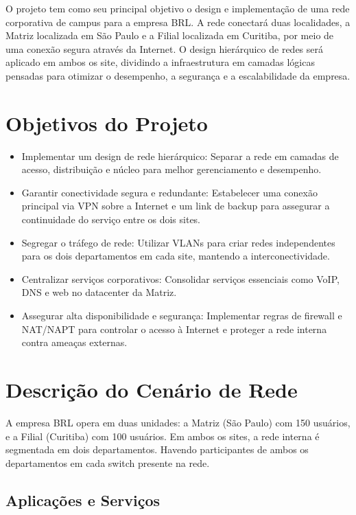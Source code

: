 \documentclass[a4paper, 12pt]{article}
\begin{document}
O projeto tem como seu principal objetivo o design e implementação de uma rede corporativa de campus para a empresa BRL. A rede conectará duas localidades, a Matriz localizada em São Paulo e a Filial localizada em Curitiba, por meio de uma conexão segura através da Internet. O design hierárquico de redes será aplicado em ambos os site, dividindo a infraestrutura em camadas lógicas pensadas para otimizar o desempenho, a segurança e a escalabilidade da empresa.

\section{Objetivos do Projeto}
\label{sec:objetivos}

\begin{itemize}
    \item Implementar um design de rede hierárquico: Separar a rede em camadas de acesso, distribuição e núcleo para melhor gerenciamento e desempenho.
    \item Garantir conectividade segura e redundante: Estabelecer uma conexão principal via VPN sobre a Internet e um link de backup para assegurar a continuidade do serviço entre os dois sites.
    \item Segregar o tráfego de rede: Utilizar VLANs para criar redes independentes para os dois departamentos em cada site, mantendo a interconectividade.
    \item Centralizar serviços corporativos: Consolidar serviços essenciais como VoIP, DNS e web no datacenter da Matriz.
    \item Assegurar alta disponibilidade e segurança: Implementar regras de firewall e NAT/NAPT para controlar o acesso à Internet e proteger a rede interna contra ameaças externas.
\end{itemize}

\section{Descrição do Cenário de Rede}
\label{sec:descricao}

A empresa BRL opera em duas unidades: a Matriz (São Paulo) com 150 usuários, e a Filial (Curitiba) com 100 usuários. Em ambos os sites, a rede interna é segmentada em dois departamentos. Havendo participantes de ambos os departamentos em cada switch presente na rede.

\subsection{Aplicações e Serviços}
\label{subsec:aplicacoes}
\end{document}
